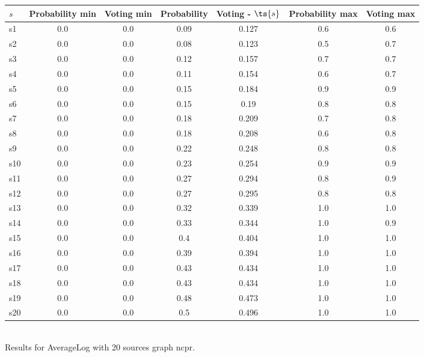 \documentclass{article}
\begin{document}
\noindent\begin{tabular}{|l|c|c|c|c|c|c|}
\hline
$s$& Probability min & Voting min & Probability & Voting - $\ts{s}$ & Probability max & Voting max\\
\hline
s1 &0.0 & 0.0 & 0.09 & 0.127 & 0.6 & 0.6\\
\hline
s2 &0.0 & 0.0 & 0.08 & 0.123 & 0.5 & 0.7\\
\hline
s3 &0.0 & 0.0 & 0.12 & 0.157 & 0.7 & 0.7\\
\hline
s4 &0.0 & 0.0 & 0.11 & 0.154 & 0.6 & 0.7\\
\hline
s5 &0.0 & 0.0 & 0.15 & 0.184 & 0.9 & 0.9\\
\hline
s6 &0.0 & 0.0 & 0.15 & 0.19 & 0.8 & 0.8\\
\hline
s7 &0.0 & 0.0 & 0.18 & 0.209 & 0.7 & 0.8\\
\hline
s8 &0.0 & 0.0 & 0.18 & 0.208 & 0.6 & 0.8\\
\hline
s9 &0.0 & 0.0 & 0.22 & 0.248 & 0.8 & 0.8\\
\hline
s10 &0.0 & 0.0 & 0.23 & 0.254 & 0.9 & 0.9\\
\hline
s11 &0.0 & 0.0 & 0.27 & 0.294 & 0.8 & 0.9\\
\hline
s12 &0.0 & 0.0 & 0.27 & 0.295 & 0.8 & 0.8\\
\hline
s13 &0.0 & 0.0 & 0.32 & 0.339 & 1.0 & 1.0\\
\hline
s14 &0.0 & 0.0 & 0.33 & 0.344 & 1.0 & 0.9\\
\hline
s15 &0.0 & 0.0 & 0.4 & 0.404 & 1.0 & 1.0\\
\hline
s16 &0.0 & 0.0 & 0.39 & 0.394 & 1.0 & 1.0\\
\hline
s17 &0.0 & 0.0 & 0.43 & 0.434 & 1.0 & 1.0\\
\hline
s18 &0.0 & 0.0 & 0.43 & 0.434 & 1.0 & 1.0\\
\hline
s19 &0.0 & 0.0 & 0.48 & 0.473 & 1.0 & 1.0\\
\hline
s20 &0.0 & 0.0 & 0.5 & 0.496 & 1.0 & 1.0\\
\hline
\end{tabular}\\

\noindent Results for AverageLog with 20 sources graph ncpr.
\end{document}
